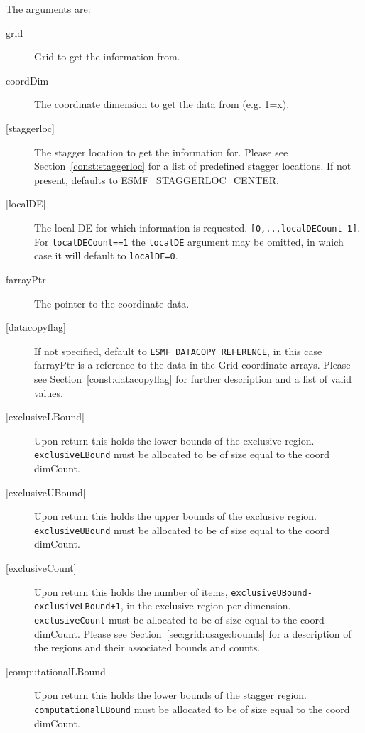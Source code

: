        The arguments are:
       \begin{description}
       \item[grid]
            Grid to get the information from.
       \item[coordDim]
            The coordinate dimension to get the data from (e.g. 1=x).
       \item[{[staggerloc]}]
            The stagger location to get the information for.
            Please see Section~\ref{const:staggerloc} for a list
            of predefined stagger locations. If not present, defaults to ESMF\_STAGGERLOC\_CENTER.
       \item[{[localDE]}]
           The local DE for which information is requested. {\tt [0,..,localDECount-1]}.
           For {\tt localDECount==1} the {\tt localDE} argument may be omitted,
            in which case it will default to {\tt localDE=0}.
       \item[{farrayPtr}]
            The pointer to the coordinate data.
       \item[{[datacopyflag]}]
            If not specified, default to {\tt ESMF\_DATACOPY\_REFERENCE}, in this case
            farrayPtr is a reference to the data in the Grid coordinate arrays.
            Please see Section~\ref{const:datacopyflag} for further description and a
            list of valid values.
       \item[{[exclusiveLBound]}]
            Upon return this holds the lower bounds of the exclusive region.
            {\tt exclusiveLBound} must be allocated to be of size equal to the coord dimCount.
       \item[{[exclusiveUBound]}]
            Upon return this holds the upper bounds of the exclusive region.
            {\tt exclusiveUBound} must be allocated to be of size equal to the coord dimCount.
       \item[{[exclusiveCount]}]
            Upon return this holds the number of items, {\tt exclusiveUBound-exclusiveLBound+1},
            in the exclusive region per dimension.
            {\tt exclusiveCount} must
            be allocated to be of size equal to the coord dimCount.
            Please see Section~\ref{sec:grid:usage:bounds} for a description
            of the regions and their associated bounds and counts.
       \item[{[computationalLBound]}]
            Upon return this holds the lower bounds of the stagger region.
            {\tt computationalLBound} must be allocated to be of size equal to the coord dimCount.

\end{description}
